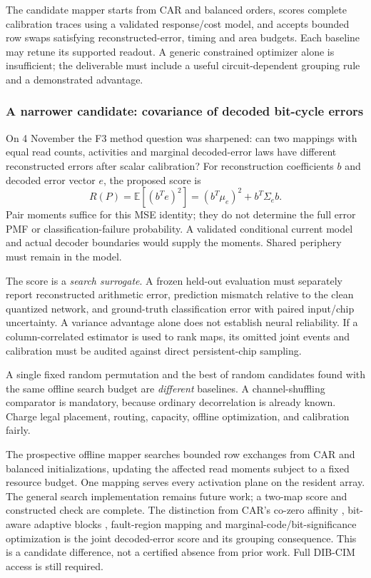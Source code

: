 The candidate mapper starts from CAR and balanced orders, scores complete calibration
traces using a validated response/cost model, and accepts bounded row swaps satisfying
reconstructed-error, timing and area budgets. Each baseline may retune its supported
readout. A generic constrained optimizer alone is insufficient; the deliverable must
include a useful circuit-dependent grouping rule and a demonstrated advantage.

\subsubsection{A narrower candidate: covariance of decoded bit-cycle errors}

On 4 November the F3 method question was sharpened: can two mappings with equal read
counts, activities and marginal decoded-error laws have different reconstructed errors
after scalar calibration? For reconstruction coefficients $b$ and decoded error vector
$e$, the proposed score is
\begin{equation}
 R(P)=\mathbb E[(b^Te)^2]=(b^T\mu_e)^2+b^T\Sigma_e b.
\end{equation}
Pair moments suffice for this MSE identity; they do not determine the full error PMF or
classification-failure probability. A validated conditional current model and actual
decoder boundaries would supply the moments. Shared periphery must remain in the model.

The score is a \emph{search surrogate}. A frozen held-out evaluation must separately
report reconstructed arithmetic error, prediction mismatch relative to the clean
quantized network, and ground-truth classification error with paired input/chip uncertainty.
A variance advantage alone does not establish neural reliability. If a column-correlated
estimator is used to rank maps, its omitted joint events and calibration must be audited
against direct persistent-chip sampling.

A single fixed random permutation and the best of random candidates found with the same
offline search budget are \emph{different} baselines. A channel-shuffling comparator is
mandatory, because ordinary decorrelation is already known. Charge legal placement,
routing, capacity, offline optimization, and calibration fairly.

The prospective offline mapper searches bounded row exchanges from CAR and balanced
initializations, updating the affected read moments subject to a fixed resource budget.
One mapping serves every activation plane on the resident array. The general search
implementation remains future work; a two-map score and constructed check are complete.
The distinction from CAR's co-zero affinity \cite{S01}, bit-aware adaptive blocks
\cite{S02}, fault-region mapping \cite{S07} and marginal-code/bit-significance optimization
\cite{S31} is the joint decoded-error score and its grouping consequence. This is a
candidate difference, not a certified absence from prior work. Full DIB-CIM access is
still required.

